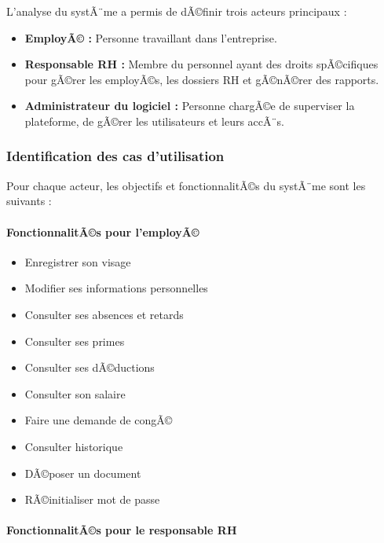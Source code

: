 L'analyse du systÃ¨me a permis de dÃ©finir trois acteurs principaux :

\begin{itemize}
  \item \textbf{EmployÃ© :} Personne travaillant dans l'entreprise.
  \item \textbf{Responsable RH :} Membre du personnel ayant des droits spÃ©cifiques pour
        gÃ©rer les employÃ©s, les dossiers RH et gÃ©nÃ©rer des rapports.
  \item \textbf{Administrateur du logiciel :} Personne chargÃ©e de superviser la plateforme,
        de gÃ©rer les utilisateurs et leurs accÃ¨s.
\end{itemize}

\subsubsection{Identification des cas d'utilisation}

Pour chaque acteur, les objectifs et fonctionnalitÃ©s du systÃ¨me sont les suivants :

\paragraph{FonctionnalitÃ©s pour l'employÃ©}

\begin{itemize}
  \item Enregistrer son visage
  \item Modifier ses informations personnelles
  \item Consulter ses absences et retards
  \item Consulter ses primes
  \item Consulter ses dÃ©ductions
  \item Consulter son salaire
  \item Faire une demande de congÃ©
  \item Consulter historique
  \item DÃ©poser un document
  \item RÃ©initialiser mot de passe
\end{itemize}

\paragraph{FonctionnalitÃ©s pour le responsable RH}

